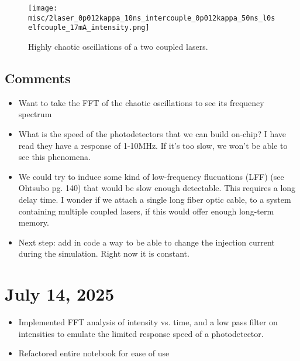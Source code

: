 \documentclass[11pt,letterpaper]{article}
\begin{document}
\begin{figure}[H]
\centering
\texttt{[image: misc/2laser\_0p012kappa\_10ns\_intercouple\_0p012kappa\_50ns\_l0selfcouple\_17mA\_intensity.png]}
\caption{Highly chaotic oscillations of a two coupled lasers.\label{twochaoticosc}}
\end{figure}

\subsection{Comments}
\begin{itemize}
    \item Want to take the FFT of the chaotic oscillations to see its frequency spectrum
    \item What is the speed of the photodetectors that we can build on-chip? I have read they have a response of 1-10MHz. If it's too slow, we won't be able to see this phenomena.
    \item We could try to induce some kind of low-frequency flucuations (LFF) (see Ohtsubo pg. 140) that would be slow enough detectable. This requires a long delay time. I wonder if we attach a single long fiber optic cable, to a system containing multiple coupled lasers, if this would offer enough long-term memory.
    \item Next step: add in code a way to be able to change the injection current during the simulation. Right now it is constant.
\end{itemize}

\section{July 14, 2025}

\begin{itemize}
    \item Implemented FFT analysis of intensity vs. time, and a low pass filter on intensities to emulate the limited response speed of a photodetector.
    \item Refactored entire notebook for ease of use
\end{itemize}
\end{document}
